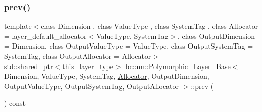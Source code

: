 \mbox{\label{structbc_1_1nn_1_1Polymorphic__Layer__Base_a0e55941ac286ccaf77b4c810a8f1cd09}} 
\subsubsection{\texorpdfstring{prev()}{prev()}\hspace{0.1cm}{\footnotesize\ttfamily [3/4]}}
{\footnotesize\ttfamily template$<$class Dimension , class Value\+Type , class System\+Tag , class Allocator  = layer\+\_\+default\+\_\+allocator$<$\+Value\+Type, System\+Tag$>$, class Output\+Dimension  = Dimension, class Output\+Value\+Type  = Value\+Type, class Output\+System\+Tag  = System\+Tag, class Output\+Allocator  = Allocator$>$ \\
std\+::shared\+\_\+ptr$<$\hyperlink{structbc_1_1nn_1_1Polymorphic__Layer__Base_a6087076d2e0a31e6bbdc2c2039c3ab52}{this\+\_\+layer\+\_\+type}$>$ \hyperlink{structbc_1_1nn_1_1Polymorphic__Layer__Base}{bc\+::nn\+::\+Polymorphic\+\_\+\+Layer\+\_\+\+Base}$<$ Dimension, Value\+Type, System\+Tag, \hyperlink{classbc_1_1allocators_1_1Allocator}{Allocator}, Output\+Dimension, Output\+Value\+Type, Output\+System\+Tag, Output\+Allocator $>$\+::prev (\begin{DoxyParamCaption}{ }\end{DoxyParamCaption}) const\hspace{0.3cm}{\ttfamily [inline]}}

\mbox{\label{structbc_1_1nn_1_1Polymorphic__Layer__Base_a0e55941ac286ccaf77b4c810a8f1cd09}} 
